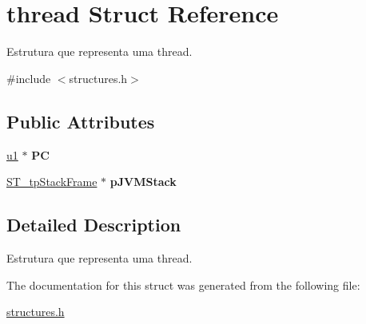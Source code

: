 \hypertarget{structthread}{}\section{thread Struct Reference}
\label{structthread}


Estrutura que representa uma thread.  




{\ttfamily \#include $<$structures.\+h$>$}

\subsection*{Public Attributes}
\begin{DoxyCompactItemize}
\item 
\mbox{\label{structthread_ad0b5fdd7ce5ba77489df8b724af271e1}} 
\mbox{\hyperlink{structures_8h_ad9f4cdb6757615aae2fad89dab3c5470}{u1}} $\ast$ {\bfseries PC}
\item 
\mbox{\label{structthread_aa071425aeea980deab5314098d7edc37}} 
\mbox{\hyperlink{structures_8h_a6488b2ebbc0216565a0c4de6a5d08a5e}{S\+T\+\_\+tp\+Stack\+Frame}} $\ast$ {\bfseries p\+J\+V\+M\+Stack}
\end{DoxyCompactItemize}


\subsection{Detailed Description}
Estrutura que representa uma thread. 

The documentation for this struct was generated from the following file\+:\begin{DoxyCompactItemize}
\item 
\mbox{\hyperlink{structures_8h}{structures.\+h}}\end{DoxyCompactItemize}
